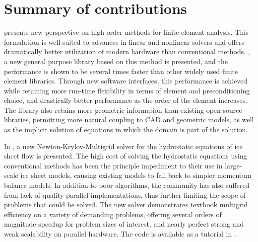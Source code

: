 \section{Summary of contributions}

 presents new perspective on high-order methods for finite element analysis.
This formulation is well-suited to advances in linear and nonlinear solvers and offers dramatically better utilization of modern hardware than conventional methods.
\Dohp, a new general purpose library based on this method is presented, and the performance is shown to be several times faster than other widely used finite element libraries.
Through new software interfaces, this performance is achieved while retaining more run-time flexibility in terms of element and preconditioning choice, and drastically better performance as the order of the element increases.
The library also retains more geometric information than existing open source libraries, permitting more natural coupling to CAD and geometric models, as well as the implicit solution of equations in which the domain is part of the solution.

In , a new Newton-Krylov-Multigrid solver for the hydrostatic equations of ice sheet flow is presented.
The high cost of solving the hydrostatic equations using conventional methods has been the principle impediment to their use in large-scale ice sheet models, causing existing models to fall back to simpler momentum balance models.
In addition to poor algorithms, the community has also suffered from lack of quality parallel implementations, thus further limiting the scope of problems that could be solved.
The new solver demonstrates textbook multigrid efficiency on a variety of demanding problems, offering several orders of magnitude speedup for problem sizes of interest, and nearly perfect strong and weak scalability on parallel hardware.
The code is available as a tutorial in {\PETSc}.

